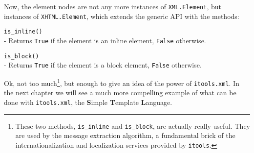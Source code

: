 Now, the element nodes are not any more instances of {\tt XML.Element}, but
instances of {\tt XHTML.Element}, which extends the generic API with the
methods:

\begin{api}
    {\tt is\_inline()}\\
    - Returns {\tt True} if the element is an inline element, {\tt False}
    otherwise.

    {\tt is\_block()}\\
    - Returns {\tt True} if the element is a block element, {\tt False}
    otherwise.
\end{api}

Ok, not too much\footnote{These two methods, {\tt is\_inline} and
{\tt is\_block}, are actually really useful. They are used by the message
extraction algorithm, a fundamental brick of the internationalization and
localization services provided by {\tt itools}.}, but enough to give an
idea of the power of {\tt itools.xml}. In the next chapter we will see a
much more compelling example of what can be done with {\tt itools.xml},
the {\bf S}imple {\bf T}emplate {\bf L}anguage.


